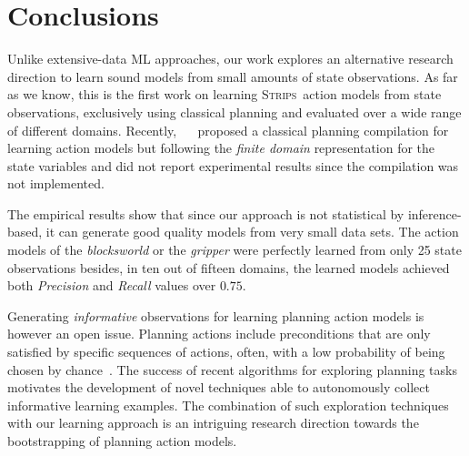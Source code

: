 \documentclass{article}
\newcommand{\strips}{\textsc{Strips}}     %
\begin{document}
\section{Conclusions}
Unlike extensive-data ML approaches, our work explores an alternative research direction to learn sound models from small amounts of state observations. As far as we know, this is the first work on learning \strips\ action models from state observations, exclusively using classical planning and evaluated over a wide range of different domains. Recently, ~\citeauthor{stern2017efficient}~\citeyear{stern2017efficient} proposed a classical planning compilation for learning action models but following the {\em finite domain} representation for the state variables and did not report experimental results since the compilation was not implemented.

The empirical results show that since our approach is not statistical by inference-based, it can generate good quality models from very small data sets. The action models of the {\em blocksworld} or the {\em gripper} were perfectly learned from only 25 state observations besides, in ten out of fifteen domains, the learned models achieved both {\em Precision} and {\em Recall} values over $0.75$.

Generating {\em informative} observations for learning planning action models is however an open issue. Planning actions include preconditions that are only satisfied by specific sequences of actions, often, with a low probability of being chosen by chance~\cite{fern2004learning}. The success of recent algorithms for exploring planning tasks~\cite{geffner:novelty:IJCAI17} motivates the development of novel techniques able to autonomously collect informative learning examples. The combination of such exploration techniques with our learning approach is an intriguing research direction towards the bootstrapping of planning action models.





\end{document}
